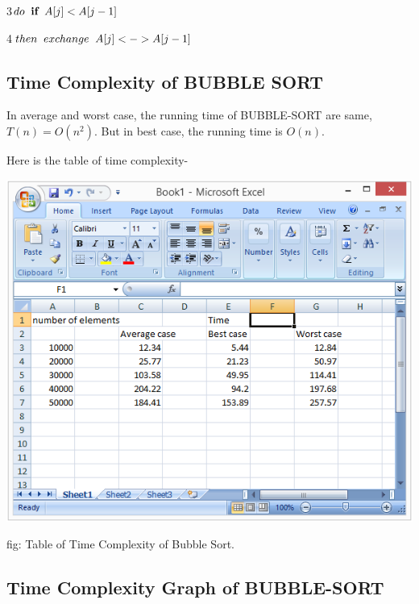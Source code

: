 \documentclass[12 pt,a4paper]{report}
\begin{document}
3\hspace{1.5cm}$do\hspace{0.2cm}\textbf{if}\hspace{0.2cm}A[j]<A[j-1]$

4\hspace{2cm}$then\hspace{0.2cm}exchange\hspace{0.2cm}A[j]<->A[j-1]$

\subsection{Time Complexity of BUBBLE SORT}

 In  average and worst case, the running time of BUBBLE-SORT are same, $T(n)=O(n^2)$. But in best case, the running time is $O(n)$.

\vspace{1cm}

Here is the table of time complexity-

\vspace{1cm}

\includegraphics{bubbledata.png}

\hspace{5cm}fig: Table of Time Complexity of Bubble Sort.

\subsection{Time Complexity Graph of BUBBLE-SORT}
\end{document}
